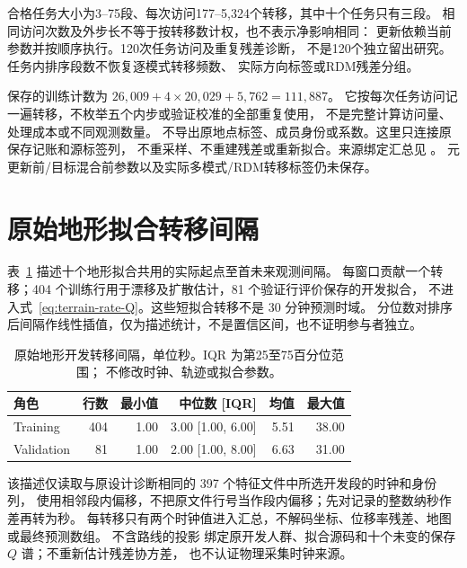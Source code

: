 合格任务大小为3--75段、每次访问177--5,324个转移，其中十个任务只有三段。
相同访问次数及外步长不等于按转移数计权，也不表示净影响相同：
更新依赖当前参数并按顺序执行。120次任务访问及重复残差诊断，
不是120个独立留出研究。任务内排序段数不恢复逐模式转移频数、
实际方向标签或RDM残差分组。

保存的训练计数为
$26{,}009+4\times20{,}029+5{,}762=111{,}887$。
它按每次任务访问记一遍转移，不枚举五个内步或验证校准的全部重复使用，
不是完整计算访问量、处理成本或不同观测数量。
不导出原地点标签、成员身份或系数。这里只连接原保存记账和源标签列，
不重采样、不重建残差或重新拟合。来源绑定汇总见
。
元更新前/目标混合前参数以及实际多模式/RDM转移标签仍未保存。


\section{原始地形拟合转移间隔}
\label{sec:terrain-fit-intervals}\hypertarget{sec:terrain-fit-intervals}{}
表~\ref{tab:terrain-fit-intervals} 描述十个地形拟合共用的实际起点至首未来观测间隔。
每窗口贡献一个转移；404 个训练行用于漂移及扩散估计，81 个验证行评价保存的开发拟合，
不进入式~\eqref{eq:terrain-rate-Q}。这些短拟合转移不是 30 分钟预测时域。
分位数对排序后间隔作线性插值，仅为描述统计，不是置信区间，也不证明参与者独立。

\begin{table}[htbp]
\centering\footnotesize
\caption{原始地形开发转移间隔，单位秒。IQR 为第25至75百分位范围；
不修改时钟、轨迹或拟合参数。}
\label{tab:terrain-fit-intervals}\hypertarget{tab:terrain-fit-intervals}{}
\begin{tabular}{lrrrrr}
\toprule
角色 & 行数 & 最小值 & 中位数 [IQR] & 均值 & 最大值\\
\midrule
Training & 404 & 1.00 & 3.00 [1.00, 6.00] & 5.51 & 38.00\\
Validation & 81 & 1.00 & 2.00 [1.00, 8.00] & 6.63 & 31.00\\
\bottomrule
\end{tabular}
\end{table}

该描述仅读取与原设计诊断相同的 397 个特征文件中所选开发段的时钟和身份列，
使用相邻段内偏移，不把原文件行号当作段内偏移；先对记录的整数纳秒作差再转为秒。
每转移只有两个时钟值进入汇总，不解码坐标、位移率残差、地图或最终预测数组。
不含路线的投影 
绑定原开发人群、拟合源码和十个未变的保存 $Q$ 谱；不重新估计残差协方差，
也不认证物理采集时钟来源。


